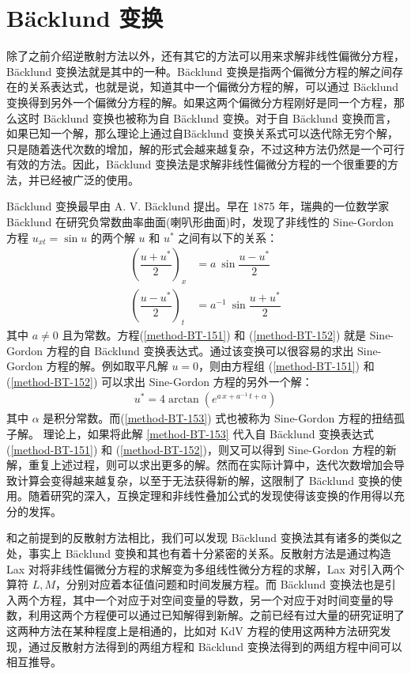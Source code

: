 \section{B\"{a}cklund 变换}
除了之前介绍逆散射方法以外，还有其它的方法可以用来求解非线性偏微分方程，B\"{a}cklund 变换法就是其中的一种。B\"{a}cklund 变换是指两个偏微分方程的解之间存在的关系表达式，也就是说，知道其中一个偏微分方程的解，可以通过 B\"{a}cklund 变换得到另外一个偏微分方程的解。如果这两个偏微分方程刚好是同一个方程，那么这时 B\"{a}cklund 变换也被称为自 B\"{a}cklund 变换。对于自 B\"{a}cklund 变换而言，如果已知一个解，那么理论上通过自B\"{a}cklund 变换关系式可以迭代除无穷个解，只是随着迭代次数的增加，解的形式会越来越复杂，不过这种方法仍然是一个可行有效的方法。因此，B\"{a}cklund 变换法是求解非线性偏微分方程的一个很重要的方法，并已经被广泛的使用。

B\"{a}cklund 变换最早由  A. V. B\"{a}cklund 提出。早在 1875 年，瑞典的一位数学家  B\"{a}cklund 在研究负常数曲率曲面(喇叭形曲面)时，发现了非线性的  Sine-Gordon 方程 $u_{xt}=\sin u $ 的两个解 $u$ 和 $u^*$ 之间有以下的关系：
\begin{eqnarray}
(\dfrac{u+u^*}{2})_{x} &= a\ \sin \dfrac{u-u^*}{2}   \label{method-BT-151} \\
(\dfrac{u-u^*}{2})_{t} &= a^{-1}\ \sin \dfrac{u+u^*}{2}  \label{method-BT-152}
\end{eqnarray}
其中 $a\neq 0$ 且为常数。方程(\ref{method-BT-151}) 和 (\ref{method-BT-152}) 就是 Sine-Gordon 方程的自 B\"{a}cklund 变换表达式。通过该变换可以很容易的求出 Sine-Gordon 方程的解。例如取平凡解 $u=0$，则由方程组 (\ref{method-BT-151}) 和 (\ref{method-BT-152}) 可以求出 Sine-Gordon 方程的另外一个解：
\begin{eqnarray}
u^*=4\arctan (e^{a\,x+a^{-1}\,t+\alpha} ) 
\label{method-BT-153}
\end{eqnarray}
其中 $\alpha$ 是积分常数。而(\ref{method-BT-153}) 式也被称为 Sine-Gordon 方程的扭结孤子解。 理论上，如果将此解 \eqref{method-BT-153} 代入自 B\"{a}cklund 变换表达式 (\ref{method-BT-151}) 和 (\ref{method-BT-152})，则又可以得到 Sine-Gordon 方程的新解，重复上述过程，则可以求出更多的解。然而在实际计算中，迭代次数增加会导致计算会变得越来越复杂，以至于无法获得新的解，这限制了 B\"{a}cklund 变换的使用。随着研究的深入，互换定理和非线性叠加公式的发现使得该变换的作用得以充分的发挥。

和之前提到的反散射方法相比，我们可以发现  B\"{a}cklund 变换法其有诸多的类似之处，事实上 B\"{a}cklund 变换和其也有着十分紧密的关系。反散射方法是通过构造 Lax 对将非线性偏微分方程的求解变为多组线性微分方程的求解，Lax 对引入两个算符 $L, M$，分别对应着本征值问题和时间发展方程。而  B\"{a}cklund 变换法也是引入两个方程，其中一个对应于对空间变量的导数，另一个对应于对时间变量的导数，利用这两个方程便可以通过已知解得到新解。之前已经有过大量的研究证明了这两种方法在某种程度上是相通的，比如对 KdV 方程的使用这两种方法研究发现，通过反散射方法得到的两组方程和 B\"{a}cklund 变换法得到的两组方程中间可以相互推导。

